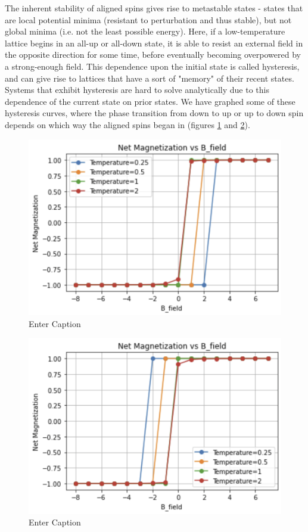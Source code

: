 \documentclass[%
 reprint,
 amsmath,amssymb,
 aps,
]{revtex4-2}
\begin{document}
The inherent stability of aligned spins gives rise to metastable states - states that are local potential minima (resistant to perturbation and thus stable), but not global minima (i.e. not the least possible energy). Here, if a low-temperature lattice begins in an all-up or all-down state, it is able to resist an external field in the opposite direction for some time, before eventually becoming overpowered by a strong-enough field. 
This dependence upon the initial state is called hysteresis, and can give rise to lattices that have a sort of "memory" of their recent states. Systems that exhibit hysteresis are hard to solve analytically due to this dependence of the current state on prior states.
We have graphed some of these hysteresis curves, where the phase transition from down to up or up to down spin depends on which way the aligned spins began in (figures \ref{fig:hysteresis_spin_down} and \ref{fig:hysteresis_spin_up}).

\begin{figure}
    \centering
    \includegraphics[width=1\linewidth]{hysteresis_spin_down.png}
    \caption{Enter Caption}
    \label{fig:hysteresis_spin_down}
\end{figure}

\begin{figure}
    \centering
    \includegraphics[width=1\linewidth]{hysteresis_spin_up.png}
    \caption{Enter Caption}
    \label{fig:hysteresis_spin_up}
\end{figure}
\end{document}

